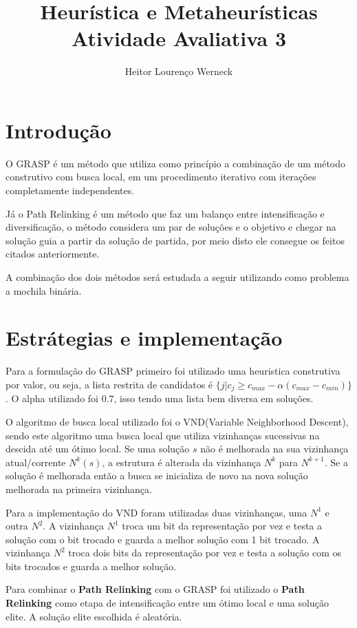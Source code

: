 \documentclass[11pt]{article}
\author{Heitor Lourenço Werneck}
\date{}
\title{Heurística e Metaheurísticas\\\medskip
\large Atividade Avaliativa 3}
\begin{document}
\maketitle

\section{Introdução}
\label{sec:orgaef57ef}

O GRASP é um método que utiliza como princípio a combinação de um método construtivo com busca local, em um procedimento iterativo com iterações completamente independentes.

Já o Path Relinking é um método que faz um balanço entre intensificação e diversificação, o método considera um par de soluções e o objetivo e chegar na solução guia a partir da solução de partida, por meio disto ele consegue os feitos citados anteriormente.

A combinação dos dois métodos será estudada a seguir utilizando como problema a mochila binária.

\section{Estrátegias e implementação}
\label{sec:orgfb3cff4}

Para a formulação do GRASP primeiro foi utilizado uma heuristica construtiva por valor, ou seja, a lista restrita de candidatos é \(\{j | c_j \geq c_{max} - \alpha(c_{max}-c_{min})\}\). O alpha utilizado foi \(0.7\), isso tendo uma lista bem diversa em soluções.

O algoritmo de busca local utilizado foi o VND(Variable Neighborhood Descent), sendo este algoritmo uma busca local que utiliza vizinhanças sucessivas na descida até um ótimo local. Se uma solução \(s\) não é melhorada na sua vizinhança atual/corrente \(N^k(s)\), a estrutura é alterada da vizinhança \(N^k\) para \(N^{k+1}\). Se a solução é melhorada então a busca se inicializa de novo na nova solução melhorada na primeira vizinhança.

Para a implementação do VND foram utilizadas duas vizinhanças, uma \(N^1\) e outra \(N^2\). A vizinhança \(N^1\) troca um bit da representação por vez e testa a solução com o bit trocado e guarda a melhor solução com 1 bit trocado. A vizinhança \(N^2\) troca dois bits da representação por vez e testa a solução com os bits trocados e guarda a melhor solução.

Para combinar o \textbf{Path Relinking} com o GRASP foi utilizado o \textbf{Path Relinking} como etapa de intensificação entre um ótimo local e uma solução elite. A solução elite escolhida é aleatória.
\end{document}
